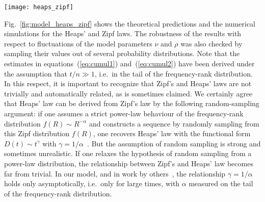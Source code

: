\documentclass[graybox]{svmult}
\begin{document}
\begin{figure*}[t]
\centering
\texttt{[image: heaps\_zipf]}
\caption{{\bf Heaps' law (left) and Zipf's law (right) in the urn model with triggering.}  Straight lines in the Heaps' law plots show functions of the form $f(x)=a x^{\gamma}$ with the exponent $\gamma=\nu/\rho$ as predicted by the analytic results and confirmed in the numerical simulations. Straight lines in the Zipf's law plots show functions of the form $f(x)=a x^{-\alpha}$, where the exponent $\alpha$ is equal to $\gamma^{-1}$.  Note that the frequency-rank plots in real data deviate from a pure power-law behavior and the correspondence between the $\gamma$ and $\alpha$ exponents is valid only asymptotically.}
  \label{fig:model_heaps_zipf}
\end{figure*}


Fig.~\ref{fig:model_heaps_zipf} shows the theoretical predictions  and the numerical simulations for the Heaps' and Zipf laws.  The robustness of the results with respect to fluctuations of the model parameters $\nu$ and $\rho$ was also checked by sampling their values out of several probability distributions.  Note that the estimates in equations~(\ref{eq:cumul1}) and~(\ref{eq:cumul2}) have been derived under the assumption that $t/n \gg1$, i.e.\ in the tail of the frequency-rank distribution. In this respect, it is important to recognize that Zipf's and Heaps' laws are not trivially and automatically related, as is sometimes claimed. We certainly agree that Heaps' law can be derived from Zipf's law by the following random-sampling argument: if one assumes a strict power-law behaviour of the frequency-rank distribution $f(R) \sim R^{-\alpha}$ and constructs a sequence by randomly sampling from this Zipf distribution $f(R)$, one recovers Heaps' law with the functional form $D(t) \sim t^{\gamma}$ with $\gamma =1/\alpha$~\cite{serrano_2009,lu_2010}. 
But the assumption of random sampling is strong and sometimes unrealistic. If one relaxes the hypothesis of random sampling from a power-law distribution, the relationship between Zipf's and Heaps' law becomes far from trivial. In our model, and in work by others~\cite{lu_2010}, the relationship $\gamma = 1/\alpha$ holds only asymptotically, i.e.\ only for large times, with $\alpha$ measured on the tail of the frequency-rank distribution. 
\end{document}
